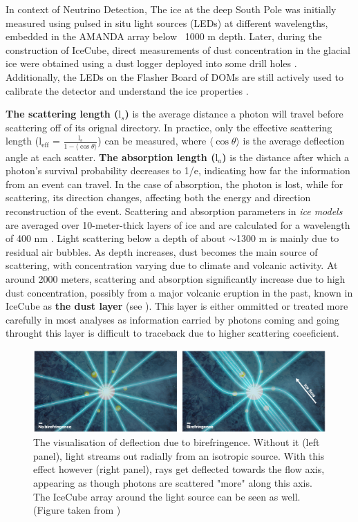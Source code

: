 In context of Neutrino Detection, The ice at the deep South Pole was initially measured using pulsed in situ light sources (LEDs) at different wavelengths, embedded in the AMANDA array below ~1000 m depth. Later, during the construction of IceCube, direct measurements of dust concentration in the glacial ice were obtained using a dust logger deployed into some drill holes . Additionally, the LEDs on the Flasher Board of DOMs are still actively used to calibrate the detector and understand the ice properties . 

\textbf{The scattering length ($\mathrm{l}_s$)} is the average distance a photon will travel before scattering off of its orignal directory. In practice, only the effective scattering length ($\mathrm{l}_\mathrm{eff}$ = $\frac{\mathrm{l}_s}{1 - \langle\cos\theta\rangle}$) can be measured, where $\langle\cos\theta\rangle$ is the average deflection angle at each scatter. \textbf{The absorption length ($\mathrm{l}_a$)} is the distance after which a photon's survival probability decreases to 1/e, indicating how far the information from an event can travel. In the case of absorption, the photon is lost, while for scattering, its direction changes, affecting both the energy and direction reconstruction of the event. Scattering and absorption parameters in \emph{ice models} are averaged over 10-meter-thick layers of ice and are calculated for a wavelength of 400 nm \cite{spicemie}. Light scattering below a depth of about $\sim$1300 m is mainly due to residual air bubbles. As depth increases, dust becomes the main source of scattering, with concentration varying due to climate and volcanic activity. At around 2000 meters, scattering and absorption significantly increase due to high dust concentration, possibly from a major volcanic eruption in the past, known in IceCube as \textbf{the dust layer}  (see ). This layer is either ommitted or treated more carefully in most analyses as information carried by photons coming and going throught this layer is difficult to traceback due to higher scattering coeeficient.
\begin{figure}
	\centering \includegraphics{./figures/nu_in_icecube/bfr_illustration.png}
	\caption{The visualisation of deflection due to birefringence. Without it (left panel), light streams out radially from an isotropic source. With this effect however (right panel), rays get deflected towards the flow axis, appearing as though photons are scattered "more" along this axis. The IceCube array around the light source can be seen as well. (Figure taken from \cite{BFR_paper})}
\end{figure}

